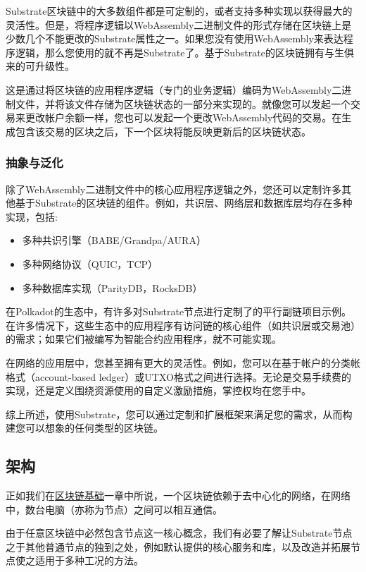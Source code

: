 Substrate区块链中的大多数组件都是可定制的，或者支持多种实现以获得最大的灵活性。但是，将程序逻辑以WebAssembly二进制文件的形式存储在区块链上是少数几个不能更改的Substrate属性之一。如果您没有使用WebAssembly来表达程序逻辑，那么您使用的就不再是Substrate了。基于Substrate的区块链拥有与生俱来的可升级性。

这是通过将区块链的应用程序逻辑（专门的业务逻辑）编码为WebAssembly二进制文件，并将该文件存储为区块链状态的一部分来实现的。就像您可以发起一个交易来更改帐户余额一样，您也可以发起一个更改WebAssembly代码的交易。在生成包含该交易的区块之后，下一个区块将能反映更新后的区块链状态。

\hypertarget{ux62bdux8c61ux4e0eux6cdbux5316}{%
\subsubsection{抽象与泛化}\label{ux62bdux8c61ux4e0eux6cdbux5316}}

除了WebAssembly二进制文件中的核心应用程序逻辑之外，您还可以定制许多其他基于Substrate的区块链的组件。例如，共识层、网络层和数据库层均存在多种实现，包括:

\begin{itemize}
\item
  多种共识引擎（BABE/Grandpa/AURA）
\item
  多种网络协议（QUIC，TCP）
\item
  多种数据库实现（ParityDB，RocksDB）
\end{itemize}

在Polkadot的生态中，有许多对Substrate节点进行定制了的平行副链项目示例。在许多情况下，这些生态中的应用程序有访问链的核心组件（如共识层或交易池）的需求；如果它们被编写为智能合约应用程序，就不可能实现。

在网络的应用层中，您甚至拥有更大的灵活性。例如，您可以在基于帐户的分类帐格式（account-based
ledger）或UTXO格式之间进行选择。无论是交易手续费的实现，还是定义围绕资源使用的自定义激励措施，掌控权均在您手中。

综上所述，使用Substrate，您可以通过定制和扩展框架来满足您的需求，从而构建您可以想象的任何类型的区块链。

\subsection{架构}

正如我们在\href{/fundamentals/blockchain-basics}{区块链基础}一章中所说，一个区块链依赖于去中心化的网络，在网络中，数台电脑（亦称为节点）之间可以相互通信。

由于任意区块链中必然包含节点这一核心概念，我们有必要了解让Substrate节点之于其他普通节点的独到之处，例如默认提供的核心服务和库，以及改造并拓展节点使之适用于多种工况的方法。

